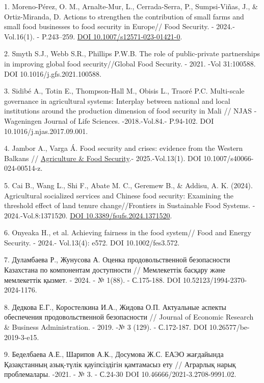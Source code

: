 \begin{refs}
1. Moreno-Pérez, O. M., Arnalte-Mur, L., Cerrada-Serra, P.,
Sumpsi-Viñas, J., \& Ortiz-Miranda, D. Actions to strengthen the
contribution of small farms and small food businesses to food security
in Europe// Food Security. - 2024.- Vol.16(1). - P.243--259.
\href{https://doi.org/10.1007/s12571-023-01421-0}{DOI
10.1007/s12571-023-01421-0}.

2. Smyth S.J., Webb S.R., Phillips P.W.B. The role of public-private
partnerships in improving global food security//Global Food Security. -
2021. -Vol 31:100588. DOI 10.1016/j.gfs.2021.100588.

3. Sidibé A., Totin E., Thompson-Hall M., Obisis L., Traoré P.C.
Multi-scale governance in agricultural systems: Interplay between
national and local institutions around the production dimension of food
security in Mali // NJAS - Wageningen Journal of Life Sciences.
-2018.-Vol.84.- P.94-102. DOI 10.1016/j.njas.2017.09.001.

4. Jambor A., Varga Á. Food security and crises: evidence from the
Western Balkans //
\href{https://www.researchgate.net/journal/Agriculture-Food-Security-2048-7010?_tp=eyJjb250ZXh0Ijp7ImZpcnN0UGFnZSI6InB1YmxpY2F0aW9uIiwicGFnZSI6InB1YmxpY2F0aW9uIn19}{Agriculture
\& Food Security}.- 2025.-Vol.13(1). DOI 10.1007/s40066-024-00514-z.

5. Cai B., Wang L., Shi F., Abate M. C., Geremew B., \& Addisu, A. K.
(2024). Agricultural socialized services and Chinese food security:
Examining the threshold effect of land tenure change//Frontiers in
Sustainable Food Systems. - 2024.-Vol.8:1371520.
\href{https://doi.org/10.3389/fsufs.2024.1371520}{DOI
10.3389/fsufs.2024.1371520}.

6. Onyeaka H., et al. Achieving fairness in the food system// Food and
Energy Security. - 2024.- Vol.13(4): e572. DOI 10.1002/fes3.572.

7. Дуламбаева Р., Жунусова А. Оценка продовольственной безопасности
Казахстана по компонентам доступности // Мемлекеттік басқару және
мемлекеттік қызмет. - 2024. - № 1(88). - С.175-188. DOI
10.52123/1994-2370-2024-1176.

8. Дедкова Е.Г., Коростелкина И.А., Жидова О.П. Актуальные аспекты
обеспечения продовольственной безопасности // Journal of Economic
Research \& Business Administration. - 2019. -№ 3 (129). - С.172-187.
DOI 10.26577/be-2019-3-e15.

9. Беделбаева А.Е., Шарипов А.К., Досумова Ж.С. ЕАЭО жағдайында
Қазақстанның азық-түлік қауіпсіздігін қамтамасыз ету // Аграрлық нарық
проблемалары. -2021. - № 3. - С.24-30 DOI 10.46666/2021-3.2708-9991.02.


\end{refs}
